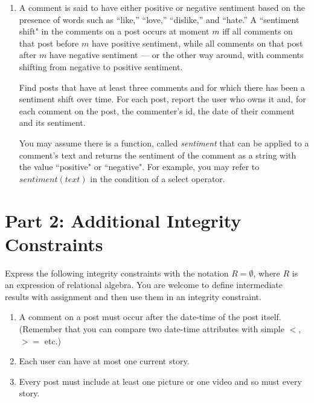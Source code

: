\documentclass{article}
\begin{document}
\begin{enumerate}
\item   %
A comment is said to have either positive or negative sentiment
based on the presence of words such as ``like,'' ``love,'' ``dislike,'' and ``hate.'' 
A ``sentiment shift" in the comments on a post occurs at moment $m$ iff
all comments on that post before $m$ have positive sentiment, 
while all comments on that post after $m$ have negative sentiment ---
or the other way around, with comments shifting from negative to positive sentiment.

Find posts that have at least three comments and for which there has been a sentiment shift over time. 
For each post, report the user who owns it and,
for each comment on the post,
the commenter's id, 
the date of their comment and its sentiment.

You may assume there is a function, called {\it sentiment}
that can be applied to a comment's text and 
returns the sentiment of the comment as a string with the value ``positive" or ``negative".
For example,
you may refer to $sentiment(text)$ in the condition of a select operator.

\end{enumerate}



\section*{Part 2: Additional Integrity Constraints}


Express the following integrity constraints
with the notation $R = \emptyset$, where $R$ is an expression of relational algebra. 
You are welcome to define intermediate results with assignment
and then use them in an integrity constraint.

\begin{enumerate}

\item   %
A comment on a post must occur after the date-time of the post itself.
(Remember that you can compare two date-time attributes with simple $<$,
$>=$ etc.)

\item %
Each user can have at most one current story.

\item %
Every post must include at least one picture or one video and so must every story.

\end{enumerate}
\end{document}
